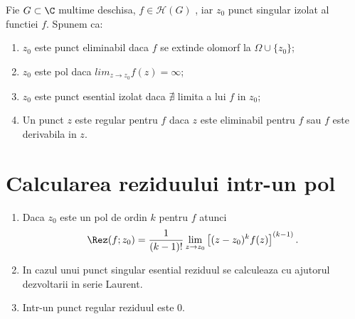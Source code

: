 \begin{definition}
    Fie $G \subset \C$ multime deschisa, $f\in\mathcal{H}(G)$ , iar $z_0$ punct singular
    izolat al functiei $f$. Spunem ca:
    \begin{enumerate}
        \item  $z_0$ este punct eliminabil daca $f$ se extinde olomorf la $\Omega \cup \{z_0\}$;
        \item  $z_0$ este pol daca $lim_{z \to z_0} f(z) = \infty$;
        \item  $z_0$ este punct esential izolat daca $\nexists$ limita a lui $f$ in $z_0$;
        \item Un punct $z$ este regular pentru $f$ daca $z$ este eliminabil pentru $f$
        sau $f$ este derivabila in $z$.
    \end{enumerate}
\end{definition}

\section{Calcularea reziduului intr-un pol}
\begin{enumerate}
    \item Daca $z_0$ este un pol de ordin $k$ pentru $f$ atunci
    \[
    \Rez(f;z_0) = \frac{1}{(k-1)!}\lim_{z \to z_0} \left[(z-z_0)^k f(z) \right]^{(k-1)}.
    \]
    \item In cazul unui punct singular esential reziduul se calculeaza cu ajutorul dezvoltarii
    in serie Laurent.
    \item Intr-un punct regular reziduul este 0.
\end{enumerate}
